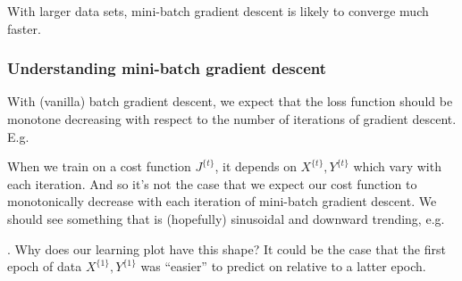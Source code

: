 \documentclass[12pt]{article}
\begin{document}
With larger data sets, mini-batch gradient descent is likely to converge much faster.

\subsubsection{Understanding mini-batch gradient descent}
With (vanilla) batch gradient descent, we expect that the loss
function should be monotone decreasing with respect to the 
number of iterations of gradient descent. E.g.
When we train on a cost function $J^{\{t\}}$, it depends on
$X^{\{t\}}, Y^{\{t\}}$ which vary with each iteration. And so
it's not the case that we expect our cost function to 
monotonically decrease with each iteration of mini-batch gradient descent. We should see something that is (hopefully) sinusoidal and downward trending, e.g.
. Why does our learning plot have this shape? It could be the case that the first epoch of data $X^{\{1\}}, Y^{\{1\}}$ was ``easier'' to predict on relative to a latter epoch.
\end{document}
